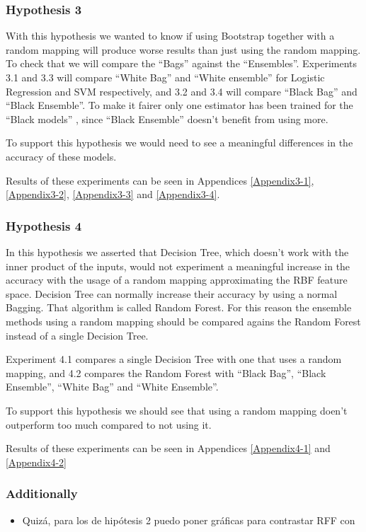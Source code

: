   \begin{pre-delivery}
  \subsubsection*{Hypothesis 3}

  With this hypothesis we wanted to know if using Bootstrap together with a
  random mapping will produce worse results than just using the random
  mapping. To check that we will compare the ``Bags'' against the ``Ensembles''.
  Experiments 3.1 and 3.3 will compare ``White Bag'' and ``White ensemble'' for
  Logistic Regression and SVM respectively, and 3.2 and 3.4 will compare
  ``Black Bag'' and ``Black Ensemble''. To make it fairer only one estimator
  has been trained for the ``Black models'' , since ``Black Ensemble''
  doesn't benefit from using more.

  To support
  this hypothesis we would need to see a meaningful
  differences in the accuracy of these models.

  Results of these experiments can be seen in Appendices
  \ref{Appendix3-1},
  \ref{Appendix3-2},
  \ref{Appendix3-3} and
  \ref{Appendix3-4}.



  \subsubsection*{Hypothesis 4}

  In this hypothesis we asserted that Decision Tree, which doesn't work with
  the inner product of the inputs, would not experiment a meaningful increase
  in the accuracy with the usage of a random mapping approximating the
  RBF feature space. Decision Tree can normally increase their accuracy
  by using a normal Bagging. That algorithm is called Random Forest. For this
  reason the ensemble methods using a random mapping should be compared agains
  the Random Forest instead of a single Decision Tree.

  Experiment 4.1 compares a single Decision Tree with one that uses a
  random mapping, and 4.2 compares the Random Forest with
  ``Black Bag'',
  ``Black Ensemble'',
  ``White Bag'' and
  ``White Ensemble''.

  To support this hypothesis we should see that using a random mapping doen't
  outperform too much compared to not using it.

  Results of these experiments can be seen in Appendices \ref{Appendix4-1}
  and \ref{Appendix4-2}
\end{pre-delivery}
\begin{note}
  \subsubsection*{Additionally}
  \begin{itemize}
    \item Quizá, para los de hipótesis 2 puedo poner gráficas para contrastar
    RFF con \Nys
  \end{itemize}
\end{note}

